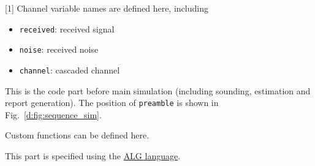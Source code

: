 [1]
Channel variable names are defined here, including
\begin{itemize}[itemsep=0em]
  \item \texttt{received}: received signal
  \item \texttt{noise}: received noise
  \item \texttt{channel}: cascaded channel
\end{itemize}

This is the code part before main simulation
(including sounding, estimation and report generation).
The position of \texttt{preamble} is shown in Fig.~\ref{d:fig:sequence_sim}.
\begin{tip}
  Custom functions can be defined here.
\end{tip}
This part is specified using the \hyperref[d:chap:alg_lang]{ALG language}.
